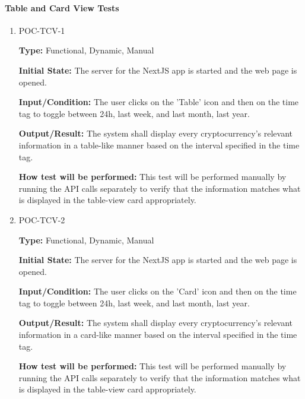 \documentclass[12pt, titlepage]{article}
\begin{document}
\paragraph{Table and Card View Tests}

\begin{enumerate}

\item{POC-TCV-1}

\textbf{Type:} Functional, Dynamic, Manual
					
\textbf{Initial State:} The server for the NextJS app is started and the web page is opened.
					
\textbf{Input/Condition:} The user clicks on the 'Table' icon and then on the time tag to toggle between 24h, last week, and last month, last year.
					
\textbf{Output/Result:} The system shall display every cryptocurrency’s relevant information in a table-like manner based on the interval specified in the time tag. 
					
\textbf{How test will be performed:} This test will be performed manually by running the API calls separately to verify that the information matches what is displayed in the table-view card appropriately.

\item{POC-TCV-2}

\textbf{Type:} Functional, Dynamic, Manual
					
\textbf{Initial State:} The server for the NextJS app is started and the web page is opened.
					
\textbf{Input/Condition:} The user clicks on the 'Card' icon and then on the time tag to toggle between 24h, last week, and last month, last year.
					
\textbf{Output/Result:} The system shall display every cryptocurrency’s relevant information in a card-like manner based on the interval specified in the time tag. 
					
\textbf{How test will be performed:} This test will be performed manually by running the API calls separately to verify that the information matches what is displayed in the table-view card appropriately.

\end{enumerate}
\newpage	
\end{document}
